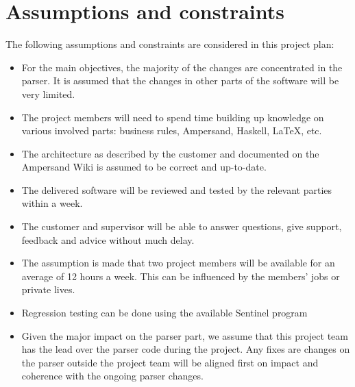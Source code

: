 \section{Assumptions and constraints}
\label{sec:assumptions-constraints}
The following assumptions and constraints are considered in this project plan:
\begin{itemize}
	\item For the main objectives, the majority of the changes are concentrated in the parser.
		It is assumed that the changes in other parts of the software will be very limited.
	\item The project members will need to spend time building up knowledge on various involved parts:
		business rules, Ampersand, Haskell, LaTeX, etc.
	\item The architecture as described by the customer and documented on the Ampersand Wiki is assumed to be correct and up-to-date.
	\item The delivered software will be reviewed and tested by the relevant parties within a week.
	\item The customer and supervisor will be able to answer questions, give support, feedback and advice without much delay.
	\item The assumption is made that two project members will be available for an average of 12 hours a week.
		This can be influenced by the members' jobs or private lives.
	\item Regression testing can be done using the available Sentinel program
	\item Given the major impact on the parser part, we assume that this project team has the lead over the parser code during the project.
		Any fixes are changes on the parser outside the project team will be aligned first on impact and coherence with the ongoing parser changes.
\end{itemize}